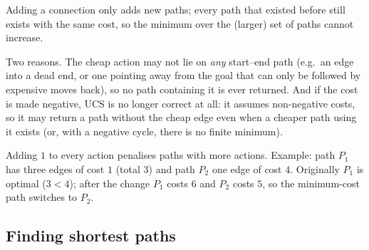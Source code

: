 \begin{solution}
\begin{description}[nosep]
  \item[(i) True.] Adding a connection only adds new paths; every path that existed before still exists with
  the same cost, so the minimum over the (larger) set of paths cannot increase.
  \item[(ii) False.] Two reasons. The cheap action may not lie on \emph{any} start--end path (e.g.\ an edge
  into a dead end, or one pointing away from the goal that can only be followed by expensive moves back), so no
  path containing it is ever returned. And if the cost is made negative, UCS is no longer correct at all: it
  assumes non-negative costs, so it may return a path without the cheap edge even when a cheaper path using it
  exists (or, with a negative cycle, there is no finite minimum).
  \item[(iii) False.] Adding $1$ to every action penalises paths with more actions. Example: path $P_1$ has three
  edges of cost $1$ (total $3$) and path $P_2$ one edge of cost $4$. Originally $P_1$ is optimal ($3<4$); after
  the change $P_1$ costs $6$ and $P_2$ costs $5$, so the minimum-cost path switches to $P_2$.
\end{description}
\end{solution}

\subsection{Finding shortest paths}


